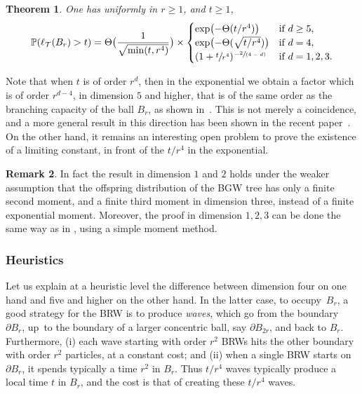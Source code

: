 \documentclass[11pt]{article}
\numberwithin{equation}{section}
\newcommand{\spfrac}[2]{\sfrac{#1}{(#2)}}
\theoremstyle{plain}
\newtheorem{theorem}{Theorem}[section]
\theoremstyle{definition}
\newtheorem{remark}[theorem]{Remark}
\newcommand\T{\mathcal{T}}
\newcommand{\1}{{\text{\Large $\mathfrak 1$}}}
\begin{document}
\begin{theorem} \label{theo.main}
One has uniformly in $r\ge 1$, and $t\ge 1$,
\begin{equation*}%
\mathbb P(\ell_{\T}(B_r) > t) =
\Theta\bigl(\frac{1}{\sqrt{\min(t,r^4)}}\bigr) \times
\begin{cases}
\exp \bigl(-\Theta(t/r^4)\bigr) & \text{if }d\ge 5, \\
\exp\bigl(- \Theta(\sqrt{ t/r^4})\bigr) & \text{if }d=4,\\
(1+\sfrac t{r^4})^{-\spfrac{2}{4-d}} & \text{if }d=1,2,3.
\end{cases}
\end{equation*}
\end{theorem}

Note that when $t$ is of order $r^d$, then in the exponential we obtain a factor which is of order $r^{d-4}$, in dimension $5$ and higher, that is of the same order as the branching capacity of the ball $B_r$, as shown in~\cite{Zhu1}.
This is not merely a coincidence, and a more general result in this direction has been shown in the recent paper~\cite{ASS23}.
On the other hand, it remains an interesting open problem to prove the existence of a limiting constant, in front of the $t/r^4$ in the exponential.

\begin{remark}
In fact the result in dimension $1$ and $2$ holds under the weaker assumption that the offspring distribution of the BGW tree has only a finite second moment, and a finite third moment in dimension three, instead of a finite exponential moment. Moreover, the proof in dimension $1,2,3$ can be done the same way as in \cite{AHJ}, using a simple moment method.
\end{remark}

\subsubsection*{Heuristics}
Let us explain at a heuristic level the difference between
dimension four on one hand and five and higher on the other hand.
In the latter case, to occupy~$B_r$, a good strategy for the BRW is to produce
\emph{waves}, which go from the boundary~$\partial B_r$,
up~to the boundary of a larger concentric ball,
say $\partial B_{2r}$, and back to $B_r$.
Furthermore, (i) each wave starting with order $r^2$ BRWs
hits the other boundary with order $r^2$ particles, at a constant cost; and
(ii) when a single BRW starts on $\partial B_r$,
it spends typically a time $r^2$ in $B_r$.
Thus $t/r^4$ waves typically produce a local time $t$ in $B_r$, and
the cost is that of creating these $t/r^4$ waves.
\end{document}
